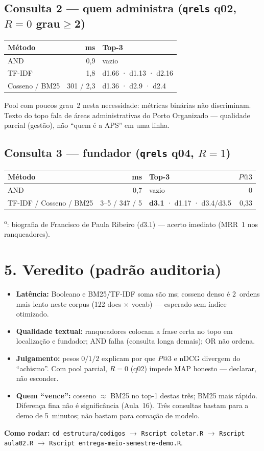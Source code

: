 \documentclass[11pt,a4paper]{article}
\begin{document}
\subsection*{Consulta 2 --- quem administra (\texttt{qrels} q02, $R{=}0$ grau$\geq$2)}
\begin{center}
\small
\begin{tabular}{@{}l r l@{}}
\toprule
Método & ms & Top-3 \\
\midrule
AND & 0,9 & vazio \\
TF-IDF & 1,8 & d1.66 · d1.13 · d2.16 \\
Cosseno / BM25 & 301 / 2,3 & d1.36 · d2.9 · d2.4 \\
\bottomrule
\end{tabular}
\end{center}
\noindent Pool com poucos grau~2 nesta necessidade: métricas binárias não discriminam.
Texto do topo fala de áreas administrativas do Porto Organizado --- qualidade
parcial (gestão), não ``quem é a APS'' em uma linha.

\subsection*{Consulta 3 --- fundador (\texttt{qrels} q04, $R{=}1$)}
\begin{center}
\small
\begin{tabular}{@{}l r l r@{}}
\toprule
Método & ms & Top-3 & $P@3$ \\
\midrule
AND & 0,7 & vazio & 0 \\
TF-IDF / Cosseno / BM25 & 3--5 / 347 / 5 & \textbf{d3.1} · d1.17 · d3.4/d3.5 & 0,33 \\
\bottomrule
\end{tabular}
\end{center}
\textsuperscript{o}: biografia de Francisco de Paula Ribeiro ($d3.1$) --- acerto imediato
(MRR~1 nos ranqueadores).

\section*{5. Veredito (padrão auditoria)}
\begin{itemize}
  \setlength\itemsep{0.1em}
  \item \textbf{Latência:} Booleano e BM25/TF-IDF soma são ms; cosseno denso é 2~ordens mais
        lento neste corpus (122 docs $\times$ vocab) --- esperado sem índice otimizado.
  \item \textbf{Qualidade textual:} ranqueadores colocam a frase certa no topo em
        localização e fundador; AND falha (consulta longa demais); OR não ordena.
  \item \textbf{Julgamento:} pesos $0/1/2$ explicam por que $P@3$ e nDCG divergem do ``achismo''.
        Com pool parcial, $R{=}0$ (q02) impede MAP honesto --- declarar, não esconder.
  \item \textbf{Quem ``vence'':} cosseno $\approx$ BM25 no top-1 destas três; BM25 mais rápido.
        Diferença fina não é significância (Aula~16). Três consultas bastam para a demo de
        5~minutos; não bastam para coroação de modelo.
\end{itemize}

\vspace{0.4em}
\noindent\textbf{Como rodar:}
\texttt{cd estrutura/codigos} $\rightarrow$
\texttt{Rscript coletar.R} $\rightarrow$
\texttt{Rscript aula02.R} $\rightarrow$
\texttt{Rscript entrega-meio-semestre-demo.R}.
\end{document}
